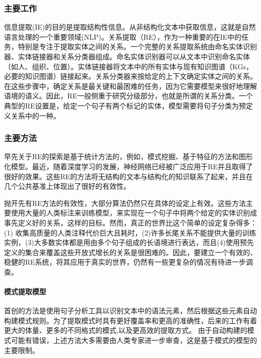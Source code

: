 \documentclass[UTF8,a4paper]{ctexart}
\begin{document}
\subsubsection{主要工作}
信息提取(IE)的目的是提取结构性信息。从非结构化文本中获取信息，这就是自然语言处理的一个重要领域(NLP)。关系提取（RE），作为一种重要的在IE中的任务，特别是专注于提取实体之间的关系。一个完整的关系提取系统由命名实体识别器、实体链接器和关系分类器组成。命名实体识别器可以从文本中识别命名实体（如人、组织、位置）。实体链接器将文本中的所有实体与现有知识图谱（KGs，必要的知识图谱）链接起来。关系分类器来按给定的上下文确定实体之间的关系。在这些步骤中，确定关系是最关键和最困难的任务，因为它需要模型来很好地理解语境的语义。因此，RE一般侧重于研究分级部分，也就是所谓的关系分类。一个典型的RE设置是，给定一个句子有两个标记的实体，模型需要将句子分类为预定义关系中的一种。
\subsubsection{主要方法}
早先关于RE的探索是基于统计方法的，例如，模式挖掘、基于特征的方法和图形化模型。最近，随着深度学习的发展，神经网络已经被广泛应用于RE并且取得了很好的效果。这些RE的方法将无结构的文本与结构化的知识联系了起来，并且在几个公共基准上体现出了很好的有效性。
\par
抛开先有RE方法的有效性，大部分算法仍然只在具体的设定上有效。这些方法主要使用大量的人类标注来训练模型，来实现在一个句子中将两个给定的实体识别成事先定义好的关系，这样的目标。然而，真正的世界比这个简单的设定复杂得多：(1) 收集高质量的人类注释代价巨大且耗时，(2)许多长尾关系不能提供大量的训练实例，(3)大多数实体都是用由多个句子组成的长语境进行表达，而且(4)使用预先定义的集合来覆盖这些开放式增长的关系是很困难的。因此，要建立一个有效的、稳健的RE系统，将其应用于真实的世界，仍然有一些更复杂的情况有待进一步调查。
\paragraph{模式提取模型}
首创的方法是使用句子分析工具以识别文本中的语法元素，然后根据这些元素自动构建模式规则\cite{10.1007/3-540-60925-3_51}。为了提取模式时具有更好覆盖率和更高的准确性，后来的工作有着更大的体量、更多的不同格式的模式\cite{10.1145/3097983.3098105},以及更高效的提取方式\cite{zheng-etal-2019-diag}。 由于自动构建的模式可能有错误，上述方法大多需要由人类专家进一步审查，这是基于模式的模型的主要限制。
\end{document}
